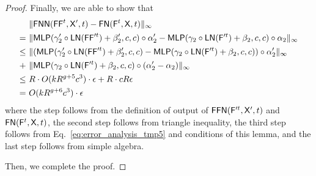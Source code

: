 \begin{proof}
    Finally, we are able to show that
    \begin{align*}
        &~\|\mathsf{FNN}(\mathsf{FF}^t,\mathsf{X}',t) - \mathsf{FN}(\mathsf{F}^t,\mathsf{X},t)\|_\infty\\
        =&~ \|\mathsf{MLP}(\gamma'_2 \circ \mathsf{LN}(\mathsf{FF}'^t)+ \beta'_2,c,c) \circ \alpha'_2 - \mathsf{MLP}(\gamma_2 \circ \mathsf{LN}(\mathsf{F}'^t)+ \beta_2,c,c) \circ \alpha_2 \|_\infty\\
        \leq&~ \| (\mathsf{MLP}(\gamma'_2 \circ \mathsf{LN}(\mathsf{FF}'^t)+ \beta'_2,c,c) - \mathsf{MLP}(\gamma_2 \circ \mathsf{LN}(\mathsf{F}'^t)+ \beta_2,c,c))\circ \alpha'_2\|_\infty \\+ &~ \|\mathsf{MLP}(\gamma_2 \circ \mathsf{LN}(\mathsf{F}'^t)+ \beta_2,c,c)  \circ (\alpha'_2 - \alpha_2) \|_\infty\\
        \leq&~ R \cdot O(kR^{g+5}c^3) \cdot \epsilon + R \cdot cR\epsilon\\
        =&~  O(kR^{g+6}c^3) \cdot \epsilon
    \end{align*}
    where the step follows from the definition of output of $\mathsf{FFN}(\mathsf{F}'^t,\mathsf{X}',t)$ and $ \mathsf{FN}(\mathsf{F}^t,\mathsf{X},t)$, the second step follows from triangle inequality, the third step follows from Eq.~\eqref{eq:error_analysis_tmp5} and conditions of this lemma, and the last step follows from simple algebra.

    Then, we complete the proof.
\end{proof}

